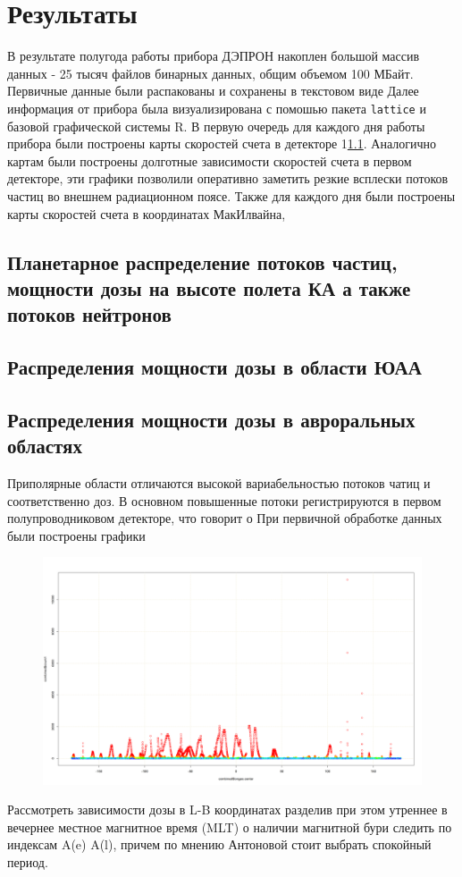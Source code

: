 
\chapter{Результаты}\label{chapt_results}
В результате полугода работы прибора ДЭПРОН накоплен большой массив данных - 25 тысяч файлов бинарных данных, общим объемом 100 МБайт. Первичные данные были распакованы и сохранены в текстовом виде 
Далее информация от прибора была визуализирована с помошью пакета \texttt{lattice} и базовой графической системы R. 
В первую очередь для каждого дня работы прибора были построены карты скоростей счета в детекторе 1\ref{sec:planetDose}. Аналогично картам были построены долготные зависимости скоростей счета в первом детекторе, эти графики позволили оперативно заметить резкие всплески потоков частиц во внешнем радиационном поясе. Также для каждого дня были построены карты скоростей счета в координатах МакИлвайна, 

\section{Планетарное распределение потоков частиц, мощности дозы на высоте полета КА а также потоков нейтронов} \label{sec:planetDose}


\section{Распределения мощности дозы в области ЮАА}

\section{Распределения мощности дозы в авроральных областях}
Приполярные области отличаются высокой вариабельностью потоков чатиц и соответственно доз. В основном повышенные потоки регистрируются в первом полупроводниковом детекторе, что говорит о 
При первичной обработке данных были построены графики 
\begin{figure}[h]
	\includegraphics[width=0.8\linewidth]{images/Flash/depron_lat_map_148}
	\caption[Потокизаряженных частиц в детекторе 1]{}
	\caption{}
	\label{fig:depronlatmap148}
\end{figure}
Рассмотреть зависимости дозы в L-B координатах разделив при этом утреннее в вечернее местное магнитное время (MLT) о наличии магнитной бури следить по индексам A(e) A(l), причем по мнению Антоновой стоит выбрать спокойный период.

